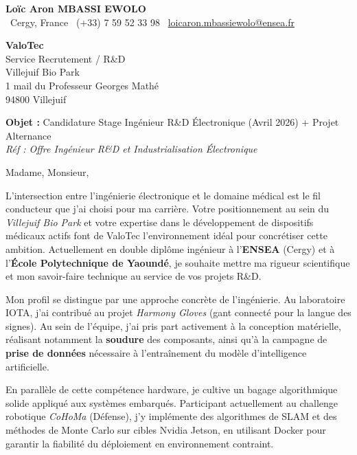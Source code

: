 \documentclass[a4paper,11pt]{article}
\begin{document}
\begin{center}
    {\Large \textbf{Loïc Aron MBASSI EWOLO}}\\[4pt]
    \small
    \faMapMarker\ Cergy, France \quad
    \faPhone\ (+33) 7 59 52 33 98 \quad
    \faEnvelope\ \href{mailto:loicaron.mbassiewolo@ensea.fr}{loicaron.mbassiewolo@ensea.fr}
\end{center}
\vspace{0.5cm}

\hfill
\begin{minipage}[t]{0.45\textwidth}
    \textbf{ValoTec}\\
    Service Recrutement / R\&D\\
    Villejuif Bio Park\\
    1 mail du Professeur Georges Mathé\\
    94800 Villejuif
\end{minipage}

\vspace{1cm}

\textbf{Objet :} Candidature Stage Ingénieur R\&D Électronique (Avril 2026) + Projet Alternance\\
\textit{Réf : Offre Ingénieur R\&D et Industrialisation Électronique}

\vspace{0.5cm}

Madame, Monsieur,

L'intersection entre l'ingénierie électronique et le domaine médical est le fil conducteur que j'ai choisi pour ma carrière. Votre positionnement au sein du \textit{Villejuif Bio Park} et votre expertise dans le développement de dispositifs médicaux actifs font de ValoTec l'environnement idéal pour concrétiser cette ambition. Actuellement en double diplôme ingénieur à l'\textbf{ENSEA} (Cergy) et à l'\textbf{École Polytechnique de Yaoundé}, je souhaite mettre ma rigueur scientifique et mon savoir-faire technique au service de vos projets R\&D.

Mon profil se distingue par une approche concrète de l'ingénierie. Au laboratoire IOTA, j'ai contribué au projet \textit{Harmony Gloves} (gant connecté pour la langue des signes). Au sein de l'équipe, j'ai pris part activement à la conception matérielle, réalisant notamment la \textbf{soudure} des composants, ainsi qu'à la campagne de \textbf{prise de données} nécessaire à l'entraînement du modèle d'intelligence artificielle.

En parallèle de cette compétence hardware, je cultive un bagage algorithmique solide appliqué aux systèmes embarqués. Participant actuellement au challenge robotique \textit{CoHoMa} (Défense), j'y implémente des algorithmes de SLAM et des méthodes de Monte Carlo sur cibles Nvidia Jetson, en utilisant Docker pour garantir la fiabilité du déploiement en environnement contraint.
\end{document}
